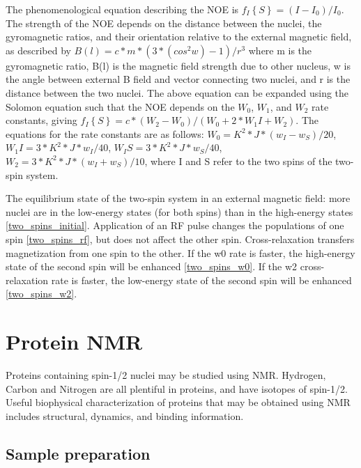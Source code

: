 The phenomenological equation describing the NOE is 
$ f_I\left\{S\right\} = (I - I_0) / I_0 $.
The strength of the NOE depends on the distance between the nuclei, 
the gyromagnetic ratios, and their orientation relative to the external 
magnetic field, as described by $B(l) = c * m * (3*(cos^2 w)-1) / r^3$
where 
m    is the gyromagnetic ratio,
B(l) is the magnetic field strength due to other nucleus,
w    is the angle between external B field and vector connecting two nuclei, and
r    is the distance between the two nuclei.
The above equation can be expanded using the Solomon equation such that the
NOE depends on the $ W_0 $, $ W_1 $, and $ W_2 $ rate constants, giving
$ f_I\left\{S\right\} = c * (W_2 - W_0) / (W_0 + 2 * W_1I + W_2) $.
The equations for the rate constants are as follows:
$ W_0 = K^2 * J * (w_I - w_S) / 20 $,
$ W_1I = 3 * K^2 * J * w_I / 40 $,
$ W_IS = 3 * K^2 * J * w_S / 40 $,
$ W_2 = 3 * K^2 * J * (w_I + w_S) / 10 $,
where I and S refer to the two spins of the two-spin system.

The equilibrium state of the two-spin system in an external magnetic field:
more nuclei are in the low-energy states (for both spins) than in the 
high-energy states \ref{two_spins_initial}.  Application of an RF pulse 
changes the populations of one spin \ref{two_spins_rf}, but does not affect
the other spin.  Cross-relaxation transfers magnetization from one spin to
the other.  If the w0 rate is faster, the high-energy state of the 
second spin will be enhanced \ref{two_spins_w0}.  If the w2 cross-relaxation 
rate is faster, the low-energy state of the second spin will be enhanced 
\ref{two_spins_w2}.



\section{Protein NMR}

Proteins containing spin-1/2 nuclei may be studied using NMR.  Hydrogen, 
Carbon and Nitrogen are all plentiful in proteins, and have isotopes of 
spin-1/2.  Useful biophysical characterization of proteins that may be 
obtained using NMR includes structural, dynamics, and binding information.

\subsection*{Sample preparation}

